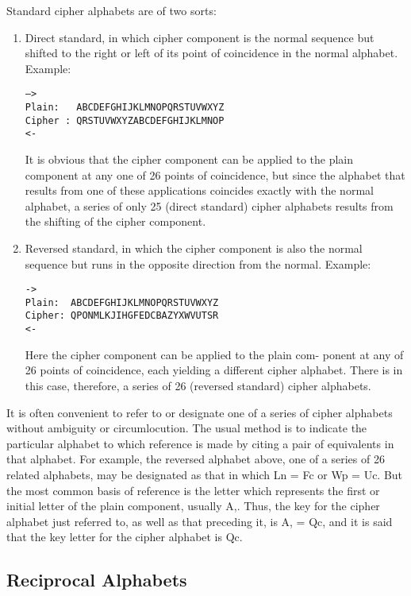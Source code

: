 \mypara Standard cipher alphabets are of two sorts:
\begin{enumerate}
\item Direct standard, in which cipher component is the normal
sequence but shifted to the right or left of its point of coincidence in the normal alphabet. Example:

\begin{verbatim}
—>
Plain:   ABCDEFGHIJKLMNOPQRSTUVWXYZ
Cipher : QRSTUVWXYZABCDEFGHIJKLMNOP
<-
\end{verbatim}

It is obvious that the cipher component can be applied to the
plain component at any one of 26 points of coincidence, but
since the alphabet that results from one of these applications
coincides exactly with the normal alphabet, a series of only
25 (direct standard) cipher alphabets results from the shifting
of the cipher component.

\item Reversed standard, in which the cipher component is also the
normal sequence but runs in the opposite direction from the
normal. Example:

\begin{verbatim}
->
Plain:  ABCDEFGHIJKLMNOPQRSTUVWXYZ
Cipher: QPONMLKJIHGFEDCBAZYXWVUTSR
<-
\end{verbatim}

Here the cipher component can be applied to the plain com-
ponent at any of 26 points of coincidence, each yielding a
different cipher alphabet. There is in this case, therefore, a
series of 26 (reversed standard) cipher alphabets.
\end{enumerate}

\mypara It is often convenient to refer to or designate one of a series of
cipher alphabets without ambiguity or circumlocution. The usual method
is to indicate the particular alphabet to which reference is made by citing
a pair of equivalents in that alphabet. For example, the reversed alphabet
above, one of a series of 26 related alphabets, may be designated as that
in which Ln = Fc or Wp = Uc. But the most common basis of reference is the letter which represents the ﬁrst or initial letter of the plain
component, usually A,. Thus, the key for the cipher alphabet just
referred to, as well as that preceding it, is A, = Qc, and it is said that the
key letter for the cipher alphabet is Qc.

\subsection{Reciprocal Alphabets}

